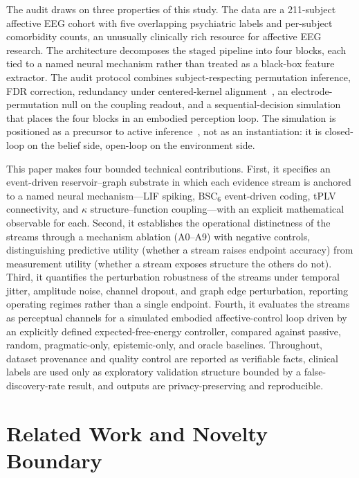 \documentclass[journal]{IEEEtran}
\begin{document}
The audit draws on three properties of this study. The data are a 211-subject affective EEG cohort with five overlapping psychiatric labels and per-subject comorbidity counts, an unusually clinically rich resource for affective EEG research. The architecture decomposes the staged pipeline into four blocks, each tied to a named neural mechanism rather than treated as a black-box feature extractor. The audit protocol combines subject-respecting permutation inference, FDR correction, redundancy under centered-kernel alignment~\cite{kornblith2019similarity}, an electrode-permutation null on the coupling readout, and a sequential-decision simulation that places the four blocks in an embodied perception loop. The simulation is positioned as a precursor to active inference~\cite{friston2010free,parr2022activeinference,pezzulo2015active}, not as an instantiation: it is closed-loop on the belief side, open-loop on the environment side.

This paper makes four bounded technical contributions. First, it specifies an event-driven reservoir--graph substrate in which each evidence stream is anchored to a named neural mechanism---LIF spiking, BSC$_6$ event-driven coding, tPLV connectivity, and $\kappa$ structure--function coupling---with an explicit mathematical observable for each. Second, it establishes the operational distinctness of the streams through a mechanism ablation (A0--A9) with negative controls, distinguishing predictive utility (whether a stream raises endpoint accuracy) from measurement utility (whether a stream exposes structure the others do not). Third, it quantifies the perturbation robustness of the streams under temporal jitter, amplitude noise, channel dropout, and graph edge perturbation, reporting operating regimes rather than a single endpoint. Fourth, it evaluates the streams as perceptual channels for a simulated embodied affective-control loop driven by an explicitly defined expected-free-energy controller, compared against passive, random, pragmatic-only, epistemic-only, and oracle baselines. Throughout, dataset provenance and quality control are reported as verifiable facts, clinical labels are used only as exploratory validation structure bounded by a false-discovery-rate result, and outputs are privacy-preserving and reproducible.

\section{Related Work and Novelty Boundary}
\end{document}
